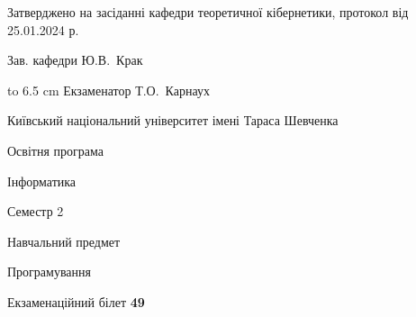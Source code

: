 \documentclass[12pt, ukrainian]{article}
\begin{document}
{\smallskip\smallskip \begin {scriptsize} Затверджено на засіданні кафедри теоретичної кібернетики, протокол   від   25.01.2024 р.\par\smallskip\smallskip\smallskip\smallskip
{\parbox {6.5 cm} {Зав. кафедри \dotfill Ю.В.~Крак}}\hspace {0.7cm} {\hbox to 6.5 cm { Екзаменатор \dotfill Т.О.~Карнаух}} \end{scriptsize}}
\newpage
{{\begin {scriptsize}\par
{ \center  Київський національний університет імені Тараса Шевченка \par}
{\parbox {5 cm}{Освітня програма \hfill}{\parbox {7 cm}{Інформатика\hfill}}\parbox {6 cm}{\hfill Семестр 2}}\par
{\parbox {5 cm} {Навчальний предмет \hfill}\parbox {7 cm}{Програмування \hfill}\parbox {6cm}{\hfill}\par}\vspace{-15pt} \end{scriptsize}}{\center Екзаменаційний білет \No \textbf { 49 }\par}}
\end{document}
